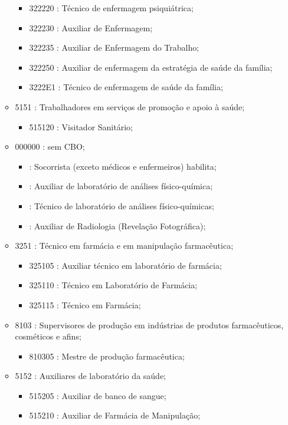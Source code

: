 \begin{itemize}
\begin{itemize}
\begin{itemize}
      \item 322220 : Técnico de enfermagem psiquiátrica;
      \item 322230 : Auxiliar de Enfermagem;
      \item 322235 : Auxiliar de Enfermagem do Trabalho;
      \item 322250 : Auxiliar de enfermagem da estratégia de saúde da família;
      \item 3222E1 : Técnico de enfermagem de saúde da família;
    \end{itemize}
    \item 5151 : Trabalhadores em serviços de promoção e apoio à saúde;
    \begin{itemize}
      \item 515120 : Visitador Sanitário;
    \end{itemize}
    \item 000000 : sem CBO;
    \begin{itemize}
      \item  : Socorrista (exceto médicos e enfermeiros) habilita;
      \item  : Auxiliar de laboratório de análises físico-química;
      \item  : Técnico de laboratório de análises físico-químicas;
      \item  : Auxiliar de Radiologia (Revelação Fotográfica);
    \end{itemize}
    \item 3251 : Técnico em farmácia e em manipulação farmacêutica;
    \begin{itemize}
      \item 325105 : Auxiliar técnico em laboratório de farmácia;
      \item 325110 : Técnico em Laboratório de Farmácia;
      \item 325115 : Técnico em Farmácia;
    \end{itemize}
    \item 8103 : Supervisores de produção em indústrias de produtos farmacêuticos, cosméticos e afins;
    \begin{itemize}
      \item 810305 : Mestre de produção farmacêutica;
    \end{itemize}
    \item 5152 : Auxiliares de laboratório da saúde;
    \begin{itemize}
      \item 515205 : Auxiliar de banco de sangue;
      \item 515210 : Auxiliar de Farmácia de Manipulação;

\end{itemize}
\end{itemize}
\end{itemize}
